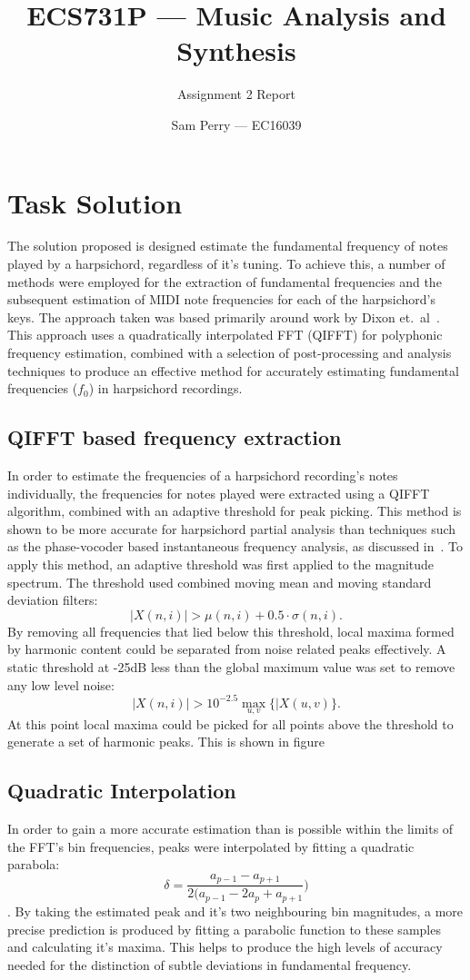\documentclass[titlepage]{scrartcl}
\begin{document}
\title{ECS731P --- Music Analysis and Synthesis}
\subtitle{\LARGE{Assignment 2 Report}}
\author{Sam Perry --- EC16039}

\maketitle
\section{Task Solution}
The solution proposed is designed estimate the fundamental frequency of notes
played by a harpsichord, regardless of it's tuning. To achieve this, a number
of methods were employed for the extraction of fundamental frequencies and the
subsequent estimation of MIDI note frequencies for each of the harpsichord's
keys. The approach taken was based primarily around work by Dixon et.\ 
al~\citeyearpar{Dixon2012}.
This approach uses a quadratically interpolated FFT (QIFFT) for polyphonic
frequency estimation, combined with a selection of post-processing and analysis
techniques to produce an effective method for accurately estimating fundamental
frequencies ($f_0$) in harpsichord recordings.

\subsection{QIFFT based frequency extraction}
In order to estimate the frequencies of a harpsichord recording's notes
individually, the frequencies for notes played were extracted using a QIFFT
algorithm, combined with an adaptive threshold for peak picking.
This method is shown to be more accurate for harpsichord partial analysis than
techniques such as the phase-vocoder based instantaneous frequency analysis, as
discussed in~\parencite{Tidhar2010}. 
To apply this method, an adaptive threshold was first applied to the magnitude
spectrum. The threshold used combined moving mean and moving standard
deviation filters:
$$\lvert X(n,i) \rvert > \mu(n,i) + 0.5 \cdot \sigma(n,i).$$
By removing all frequencies that lied below this threshold, local maxima formed
by harmonic content could be separated from noise related peaks effectively. A
static threshold at -25dB less than the global maximum value was set to remove
any low level noise:
$$\lvert X(n,i) \rvert > 10^{-2.5}\max_{u,v}\{\lvert X(u,v)\}.$$
At this point local maxima could be picked for all points above the threshold
to generate a set of harmonic peaks. This is shown in figure

\subsection{Quadratic Interpolation}
In order to gain a more accurate estimation than is possible within the limits
of the FFT's bin frequencies, peaks were interpolated by fitting a quadratic
parabola:
$$\delta = \frac{a_{p-1}-a_{p+1}}{2(a_{p-1}-2a_p+a_{p+1}})$$.
By taking the estimated peak and it's two neighbouring bin magnitudes, a
more precise prediction is produced by fitting a parabolic function to these
samples and calculating it's maxima. This helps to produce the high levels of
accuracy needed for the distinction of subtle deviations in fundamental
frequency.
\end{document}
